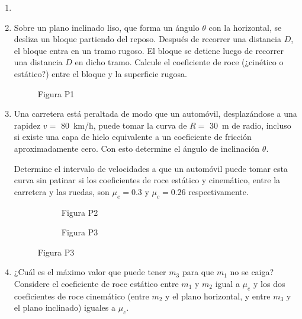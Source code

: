 \documentclass[letterpaper,11pt]{article}
\begin{document}
\vspace{-1cm}
\begin{enumerate}\setlength{\itemsep}{0.4cm}


\item[]

\item Sobre un plano inclinado liso, que forma un ángulo $\theta$ con la horizontal, se desliza un bloque partiendo del reposo. Después de recorrer una distancia $D$, el bloque entra en un tramo rugoso. El bloque se detiene luego de recorrer una distancia $D$ en dicho tramo. Calcule el coeficiente de roce (¿cinético o estático?) entre el bloque y la superficie rugosa.

\begin{figure}[h]
    \centering
    
    \caption*{Figura P1}
\end{figure}

\item Una carretera está peraltada de modo que un automóvil, desplazándose a una rapidez $v=$ \SI{80}{\km/\hour}, puede tomar la curva de $R=$ \SI{30}{m} de radio, incluso si existe una capa de hielo equivalente a un coeficiente de fricción aproximadamente cero. Con esto determine el ángulo de inclinación $\theta$.

Determine el intervalo de velocidades a que un automóvil puede tomar esta curva sin patinar si los coeficientes de roce estático y cinemático, entre la carretera y las ruedas, son $\mu_e = 0.3$ y $\mu_c = 0.26$ respectivamente.

\begin{figure}[H]
    \centering
    \begin{subfigure}[t]{0.45\textwidth}
        
        \caption*{Figura P2}
    \end{subfigure}
    \hspace{0.5em}
    \begin{subfigure}[t]{0.40\textwidth}
        
        \caption*{Figura P3}
    \end{subfigure}
\end{figure}

\item ¿Cuál es el máximo valor que puede tener $m_3$ para que $m_1$ no se caiga? Considere el coeficiente de roce estático entre $m_1$ y $m_2$ igual a $\mu_e$ y los dos coeficientes de roce cinemático (entre $m_2$ y el plano horizontal, y entre $m_3$ y el plano inclinado) iguales a $\mu_c$.


%   

\end{enumerate}
\end{document}
